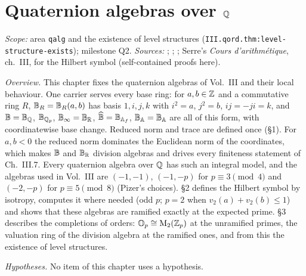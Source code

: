 
\chapter{Quaternion algebras over $\mathbb{Q}$}\label{ch:ch-iii-06-quatalg}

\noindent\emph{Scope:} area \texttt{qalg} and the existence of level structures (\texttt{III.qord.thm:level-structure-exists}); milestone Q2.
\emph{Sources:} \cite{Piz}; \cite{Voi}; \cite{Shz}; Serre's \emph{Cours d'arithm\'etique}, ch.~III, for the Hilbert symbol (self-contained proofs here).

\noindent\emph{Overview.} This chapter fixes the quaternion algebras of Vol.~III and their local behaviour. One carrier serves every base ring:
for $a,b\in\mathbb{Z}$ and a commutative ring $R$, $\mathbb{B}_R=\mathbb{B}_R(a,b)$ has basis $1,i,j,k$ with $i^2=a$, $j^2=b$, $ij=-ji=k$, and $\mathbb{B}=\mathbb{B}_{\mathbb{Q}}$,
$\mathbb{B}_{\mathbb{Q}_p}$, $\mathbb{B}_{\infty}=\mathbb{B}_{\mathbb{R}}$, $\widehat{\mathbb{B}}=\mathbb{B}_{\mathbb{A}_f}$, $\mathbb{B}_{\mathbb{A}}=\mathbb{B}_{\mathbb{A}}$ are all of this form, with coordinatewise base change. Reduced norm and trace are
defined once (§1). For $a,b<0$ the reduced norm dominates the Euclidean norm of the coordinates, which makes $\mathbb{B}$ and $\mathbb{B}_{\mathbb{R}}$ division algebras
and drives every finiteness statement of Ch.~III.7. Every quaternion algebra over $\mathbb{Q}$ has such an integral model, and the algebras used in
Vol.~III are $(-1,-1)$, $(-1,-p)$ for $p\equiv3\pmod 4$ and $(-2,-p)$ for $p\equiv5\pmod8$ (Pizer's choices). §2 defines the Hilbert symbol by
isotropy, computes it where needed (odd $p$; $p=2$ when $v_2(a)+v_2(b)\le1$) and shows that these algebras are ramified exactly at the expected
prime. §3 describes the completions of orders: $\mathbb{O}_p\cong\mathrm{M}_2(\mathbb{Z}_p)$ at the unramified primes, the valuation ring of the division algebra at
the ramified ones, and from this the existence of level structures.

\noindent\emph{Hypotheses.} No item of this chapter uses a hypothesis.

